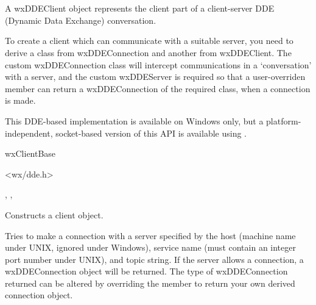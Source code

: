 \section{}\label{wxddeclient}

A wxDDEClient object represents the client part of a client-server DDE
(Dynamic Data Exchange) conversation.

To create a client which can communicate with a suitable server,
you need to derive a class from wxDDEConnection and another from wxDDEClient.
The custom wxDDEConnection class will intercept communications in
a `conversation' with a server, and the custom wxDDEServer is required
so that a user-overriden  member can return
a wxDDEConnection of the required class, when a connection is made.

This DDE-based implementation is
available on Windows only, but a platform-independent, socket-based version
of this API is available using .


wxClientBase\\


<wx/dde.h>


, , 




Constructs a client object.

\label{wxddeclientmakeconnection}


Tries to make a connection with a server specified by the host
(machine name under UNIX, ignored under Windows), service name (must
contain an integer port number under UNIX), and topic string. If the
server allows a connection, a wxDDEConnection object will be returned.
The type of wxDDEConnection returned can be altered by overriding
the  member to return your own
derived connection object.

